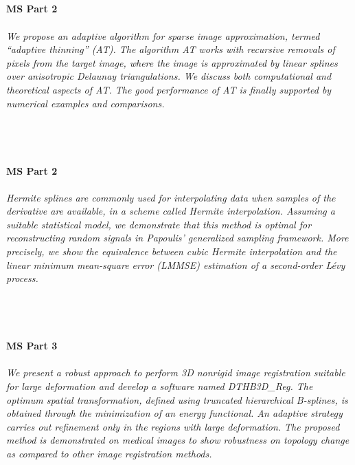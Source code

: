 \begin{multicols}{2}
\\ 
    \\
    \\\\
    \noindent\textbf{MS Part 2}\\
\\  
    \textit{We propose an adaptive algorithm for sparse image approximation, termed “adaptive thinning” (AT). The algorithm AT works with recursive removals of pixels from the target image, where the image is approximated by linear splines over anisotropic Delaunay triangulations. We discuss both computational and theoretical aspects of AT. The good performance of AT is finally supported 
by numerical examples and comparisons.}\\
\\ 
    \\
    \\\\
    \noindent\textbf{MS Part 2}\\
\\  
    \textit{Hermite splines are commonly used for interpolating data when samples of the derivative are available, in a scheme
called Hermite interpolation. Assuming a suitable statistical model, we demonstrate that this method is optimal for
reconstructing random signals in Papoulis’ generalized sampling framework. More precisely, we show the equivalence between cubic Hermite interpolation and the linear minimum mean-square error (LMMSE) estimation of a second-order Lévy process. }\\
\\ 
    \\
    \\\\
    \noindent\textbf{MS Part 3}\\
\\  
    \textit{We present a robust approach to perform 3D nonrigid image registration suitable for large deformation and develop a software named DTHB3D\_Reg. The optimum spatial transformation, defined using truncated hierarchical B-splines, is obtained through the minimization of an energy functional. An adaptive strategy carries out refinement only in the regions with large deformation. The proposed method is demonstrated on medical images to show robustness on topology change as compared to other image registration methods.}\\

\end{multicols}
